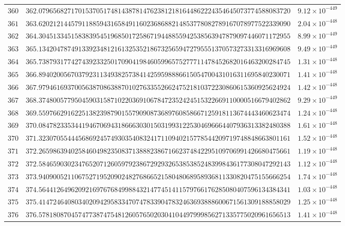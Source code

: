 \documentclass[12pt,reqno]{amsart}
\theoremstyle{remark}
\begin{document}
\begin{longtable}{clc}
$360$ & $362.0796568271701537051748143878147623812181644862224354645073774588083720$ & $9.12\times 10^{-449}$ \\
$361$ & $363.6202121445791188594316584911602368688214853778082789167078977522339090$ & $2.04\times 10^{-448}$ \\
$362$ & $364.3045133451583839545196850172586719448855942538563947879097446071172955$ & $8.99\times 10^{-449}$ \\
$363$ & $365.1342047874913392348121613253521867325659472795551370573273313316969608$ & $9.49\times 10^{-449}$ \\
$364$ & $365.7387931774274392332501709041984605996575277711478452682016463200284745$ & $1.31\times 10^{-448}$ \\
$365$ & $366.8940200567037923113493825738414259598886615054700431016311695840230071$ & $1.41\times 10^{-448}$ \\
$366$ & $367.9794616937005638708638870102763355266247521810372230860615360925624924$ & $1.42\times 10^{-448}$ \\
$367$ & $368.3748005779504590315871022036910678472352424515322669110000516679402862$ & $9.29\times 10^{-449}$ \\
$368$ & $369.5597662916225138239879015579090873689760858667125918113674443460623474$ & $1.24\times 10^{-448}$ \\
$369$ & $370.0847823353441946706943186663030150319931225304696664407936313382480388$ & $1.61\times 10^{-448}$ \\
$370$ & $371.3230705544456869245749303540832417110940215778544209719748848663801161$ & $1.52\times 10^{-448}$ \\
$371$ & $372.2659863940258460498235083713888238671662374842295109706991426680475661$ & $1.19\times 10^{-448}$ \\
$372$ & $372.5846590302347652071260597923867292932653853852483998436177308047292143$ & $1.12\times 10^{-448}$ \\
$373$ & $373.9409005211067527195209024827686652158048068958936811330820475155666254$ & $1.74\times 10^{-448}$ \\
$374$ & $374.5644126496209216976768499884321477451411579766176285080407596134384341$ & $1.03\times 10^{-448}$ \\
$375$ & $375.4147246408034020942958334707478339047832463693888600671561309188858029$ & $1.25\times 10^{-448}$ \\
$376$ & $376.5781808704574773874754812605765020304104497999856271335775020961656513$ & $1.41\times 10^{-448}$ \\

\end{longtable}
\end{document}
